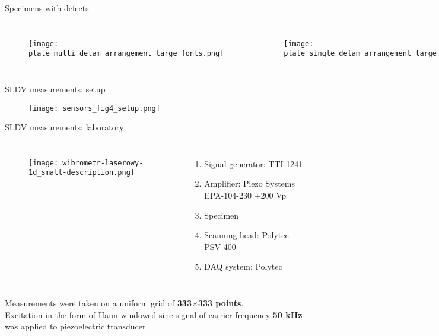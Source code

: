 \documentclass[10pt,aspectratio=169,dvipsnames]{beamer} %
\begin{document}
	\begin{frame}[t]{Specimens with defects}
		\vspace{-0.5cm}
		\begin{columns}[T]
			\begin{figure}
				\texttt{[image: plate\_multi\_delam\_arrangement\_large\_fonts.png]}
			\end{figure}
			\begin{figure}
				\texttt{[image: plate\_single\_delam\_arrangement\_large\_fonts.png]}
			\end{figure}
		\end{columns}
	\end{frame}
	\begin{frame}[t]{SLDV measurements: setup}
		\begin{figure}
			\texttt{[image: sensors\_fig4\_setup.png]}
		\end{figure}
	\end{frame}
	\begin{frame}[t]{SLDV measurements: laboratory}
		\begin{columns}[T]
			\begin{figure}
				\texttt{[image: wibrometr-laserowy-1d\_small-description.png]}
			\end{figure}
			\begin{enumerate}
				\item Signal generator: TTI 1241 
				\item Amplifier: Piezo Systems EPA-104-230 $\pm$200 Vp
				\item Specimen
				\item Scanning head: Polytec PSV-400
				\item DAQ system: Polytec
			\end{enumerate}
		\end{columns}
		{\small
		Measurements were taken on a uniform grid of \textbf{333$\times$333 points}.\\
			Excitation in the form of Hann windowed sine signal of carrier frequency \textbf{50 kHz} was applied to piezoelectric transducer.}
	\end{frame}
		
\end{document}
